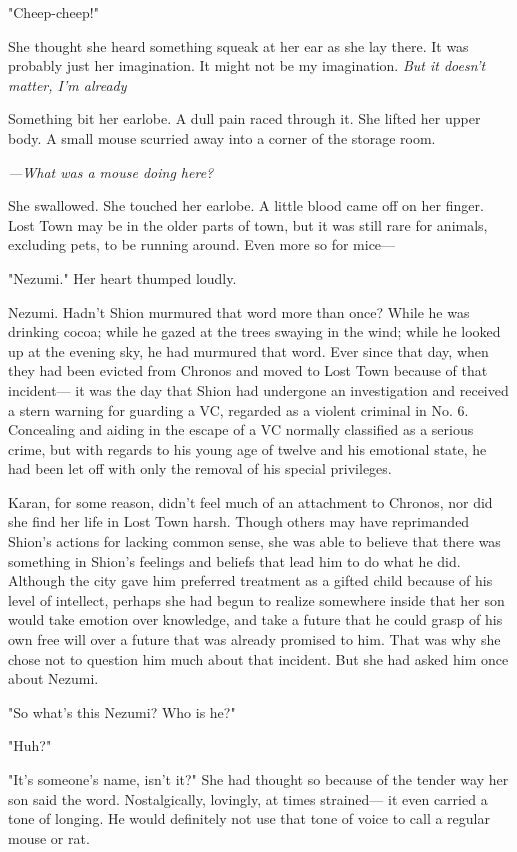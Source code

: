 "Cheep-cheep!"

She thought she heard something squeak at her ear as she lay there. It
was probably just her imagination. It might not be my imagination. \emph{But
it doesn't matter, I'm already\el }

Something bit her earlobe. A dull pain raced through it. She lifted her
upper body. A small mouse scurried away into a corner of the storage
room.

\emph{---What was a mouse doing here?}

She swallowed. She touched her earlobe. A little blood came off on her
finger. Lost Town may be in the older parts of town, but it was still
rare for animals, excluding pets, to be running around. Even more so for
mice---

"Nezumi." Her heart thumped loudly.

Nezumi. Hadn't Shion murmured that word more than once? While he was
drinking cocoa; while he gazed at the trees swaying in the wind; while
he looked up at the evening sky, he had murmured that word. Ever since
that day, when they had been evicted from Chronos and moved to Lost Town
because of that incident--- it was the day that Shion had undergone an
investigation and received a stern warning for guarding a VC, regarded
as a violent criminal in No. 6. Concealing and aiding in the escape of a
VC normally classified as a serious crime, but with regards to his young
age of twelve and his emotional state, he had been let off with only the
removal of his special privileges.

Karan, for some reason, didn't feel much of an attachment to Chronos,
nor did she find her life in Lost Town harsh. Though others may have
reprimanded Shion's actions for lacking common sense, she was able to
believe that there was something in Shion's feelings and beliefs that
lead him to do what he did. Although the city gave him preferred
treatment as a gifted child because of his level of intellect, perhaps
she had begun to realize somewhere inside that her son would take
emotion over knowledge, and take a future that he could grasp of his own
free will over a future that was already promised to him. That was why
she chose not to question him much about that incident. But she had
asked him once about Nezumi.

"So what's this Nezumi? Who is he?"

"Huh?"

"It's someone's name, isn't it?" She had thought so because of the
tender way her son said the word. Nostalgically, lovingly, at times
strained--- it even carried a tone of longing. He would definitely not use
that tone of voice to call a regular mouse or rat.

